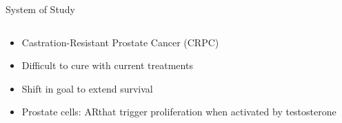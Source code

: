 \begin{frame}{System of Study}
  \begin{columns}
    \begin{column}{0.65\textwidth}
      \begin{itemize}
        \item<1-> Castration-Resistant Prostate Cancer (CRPC)
        \item<2-> Difficult to cure with current treatments
        \item<2-> Shift in goal to extend survival
        \item<4-> Prostate cells: AR\footnotemark[1] that trigger proliferation when activated by testosterone \cite{Heinlein}
      \end{itemize}
    \end{column}
    \begin{column}{0.35\textwidth}
    \end{column}
  \end{columns}
\end{frame}

